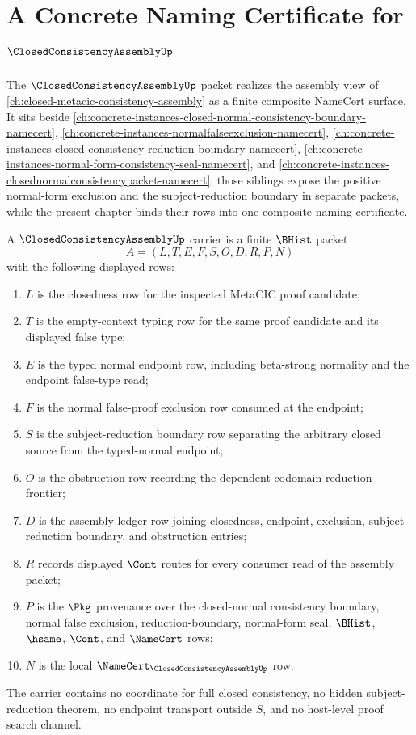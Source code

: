 \chapter{A Concrete Naming Certificate for $\ClosedConsistencyAssemblyUp$}
\label{ch:concrete-instances-closed-consistency-assembly-namecert}

The $\ClosedConsistencyAssemblyUp$ packet realizes the assembly view of \autoref{ch:closed-metacic-consistency-assembly} as a finite composite NameCert surface. It sits beside \autoref{ch:concrete-instances-closed-normal-consistency-boundary-namecert}, \autoref{ch:concrete-instances-normalfalseexclusion-namecert}, \autoref{ch:concrete-instances-closed-consistency-reduction-boundary-namecert}, \autoref{ch:concrete-instances-normal-form-consistency-seal-namecert}, and \autoref{ch:concrete-instances-closednormalconsistencypacket-namecert}: those siblings expose the positive normal-form exclusion and the subject-reduction boundary in separate packets, while the present chapter binds their rows into one composite naming certificate.

\begin{definition}
\label{def:closed-consistency-assembly-carrier}
A $\ClosedConsistencyAssemblyUp$ carrier is a finite $\BHist$ packet
$$
A=(L,T,E,F,S,O,D,R,P,N)
$$
with the following displayed rows:
\begin{enumerate}
\item $L$ is the closedness row for the inspected MetaCIC proof candidate;
\item $T$ is the empty-context typing row for the same proof candidate and its displayed false type;
\item $E$ is the typed normal endpoint row, including beta-strong normality and the endpoint false-type read;
\item $F$ is the normal false-proof exclusion row consumed at the endpoint;
\item $S$ is the subject-reduction boundary row separating the arbitrary closed source from the typed-normal endpoint;
\item $O$ is the obstruction row recording the dependent-codomain reduction frontier;
\item $D$ is the assembly ledger row joining closedness, endpoint, exclusion, subject-reduction boundary, and obstruction entries;
\item $R$ records displayed $\Cont$ routes for every consumer read of the assembly packet;
\item $P$ is the $\Pkg$ provenance over the closed-normal consistency boundary, normal false exclusion, reduction-boundary, normal-form seal, $\BHist$, $\hsame$, $\Cont$, and $\NameCert$ rows;
\item $N$ is the local $\NameCert_{\ClosedConsistencyAssemblyUp}$ row.
\end{enumerate}
The carrier contains no coordinate for full closed consistency, no hidden subject-reduction theorem, no endpoint transport outside $S$, and no host-level proof search channel.
\end{definition}

